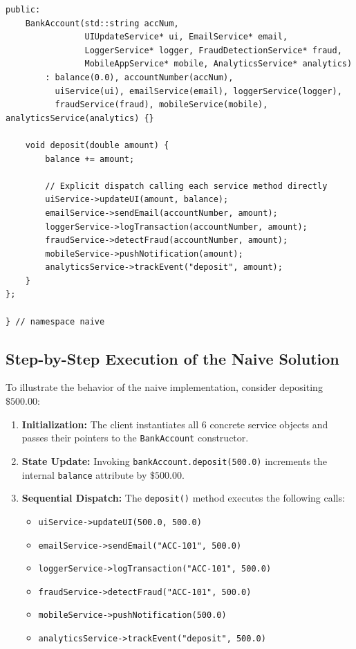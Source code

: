 \documentclass[12pt,a4paper]{article}
\begin{document}
\begin{lstlisting}[caption=Naive Bank Account with Direct Service Coupling (\texttt{naive.cpp})]
public:
    BankAccount(std::string accNum,
                UIUpdateService* ui, EmailService* email,
                LoggerService* logger, FraudDetectionService* fraud,
                MobileAppService* mobile, AnalyticsService* analytics)
        : balance(0.0), accountNumber(accNum),
          uiService(ui), emailService(email), loggerService(logger),
          fraudService(fraud), mobileService(mobile), analyticsService(analytics) {}

    void deposit(double amount) {
        balance += amount;
        
        // Explicit dispatch calling each service method directly
        uiService->updateUI(amount, balance);
        emailService->sendEmail(accountNumber, amount);
        loggerService->logTransaction(accountNumber, amount);
        fraudService->detectFraud(accountNumber, amount);
        mobileService->pushNotification(amount);
        analyticsService->trackEvent("deposit", amount);
    }
};

} // namespace naive
\end{lstlisting}

\subsection{Step-by-Step Execution of the Naive Solution}
To illustrate the behavior of the naive implementation, consider depositing $\$500.00$:
\begin{enumerate}
    \item \textbf{Initialization:} The client instantiates all 6 concrete service objects and passes their pointers to the \texttt{BankAccount} constructor.
    \item \textbf{State Update:} Invoking \texttt{bankAccount.deposit(500.0)} increments the internal \texttt{balance} attribute by $\$500.00$.
    \item \textbf{Sequential Dispatch:} The \texttt{deposit()} method executes the following calls:
    \begin{itemize}
        \item \texttt{uiService->updateUI(500.0, 500.0)}
        \item \texttt{emailService->sendEmail("ACC-101", 500.0)}
        \item \texttt{loggerService->logTransaction("ACC-101", 500.0)}
        \item \texttt{fraudService->detectFraud("ACC-101", 500.0)}
        \item \texttt{mobileService->pushNotification(500.0)}
        \item \texttt{analyticsService->trackEvent("deposit", 500.0)}
    \end{itemize}
\end{enumerate}
\end{document}
